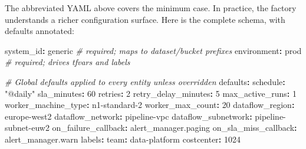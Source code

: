 \documentclass[
  11pt,
  british,
  oneside]{book}
\newenvironment{Shaded}{\begin{snugshade}}{\end{snugshade}}
\newcommand{\AttributeTok}[1]{\textcolor[rgb]{0.77,0.63,0.00}{#1}}
\newcommand{\CommentTok}[1]{\textcolor[rgb]{0.56,0.35,0.01}{\textit{#1}}}
\newcommand{\DecValTok}[1]{\textcolor[rgb]{0.00,0.00,0.81}{#1}}
\newcommand{\FunctionTok}[1]{\textcolor[rgb]{0.00,0.00,0.00}{#1}}
\newcommand{\KeywordTok}[1]{\textcolor[rgb]{0.13,0.29,0.53}{\textbf{#1}}}
\newcommand{\StringTok}[1]{\textcolor[rgb]{0.31,0.60,0.02}{#1}}
\begin{document}
The abbreviated YAML above covers the minimum case. In practice, the
factory understands a richer configuration surface. Here is the complete
schema, with defaults annotated:

\begin{Shaded}
\begin{Highlighting}[]
\FunctionTok{system\_id}\KeywordTok{:}\AttributeTok{ generic}\CommentTok{                 \# required; maps to dataset/bucket prefixes}
\FunctionTok{environment}\KeywordTok{:}\AttributeTok{ prod}\CommentTok{                  \# required; drives tfvars and labels}

\CommentTok{\# Global defaults applied to every entity unless overridden}
\FunctionTok{defaults}\KeywordTok{:}
\AttributeTok{  }\FunctionTok{schedule}\KeywordTok{:}\AttributeTok{ }\StringTok{"@daily"}
\AttributeTok{  }\FunctionTok{sla\_minutes}\KeywordTok{:}\AttributeTok{ }\DecValTok{60}
\AttributeTok{  }\FunctionTok{retries}\KeywordTok{:}\AttributeTok{ }\DecValTok{2}
\AttributeTok{  }\FunctionTok{retry\_delay\_minutes}\KeywordTok{:}\AttributeTok{ }\DecValTok{5}
\AttributeTok{  }\FunctionTok{max\_active\_runs}\KeywordTok{:}\AttributeTok{ }\DecValTok{1}
\AttributeTok{  }\FunctionTok{worker\_machine\_type}\KeywordTok{:}\AttributeTok{ n1{-}standard{-}2}
\AttributeTok{  }\FunctionTok{worker\_max\_count}\KeywordTok{:}\AttributeTok{ }\DecValTok{20}
\AttributeTok{  }\FunctionTok{dataflow\_region}\KeywordTok{:}\AttributeTok{ europe{-}west2}
\AttributeTok{  }\FunctionTok{dataflow\_network}\KeywordTok{:}\AttributeTok{ pipeline{-}vpc}
\AttributeTok{  }\FunctionTok{dataflow\_subnetwork}\KeywordTok{:}\AttributeTok{ pipeline{-}subnet{-}euw2}
\AttributeTok{  }\FunctionTok{on\_failure\_callback}\KeywordTok{:}\AttributeTok{ alert\_manager.paging}
\AttributeTok{  }\FunctionTok{on\_sla\_miss\_callback}\KeywordTok{:}\AttributeTok{ alert\_manager.warn}
\AttributeTok{  }\FunctionTok{labels}\KeywordTok{:}
\AttributeTok{    }\FunctionTok{team}\KeywordTok{:}\AttributeTok{ data{-}platform}
\AttributeTok{    }\FunctionTok{costcenter}\KeywordTok{:}\AttributeTok{ }\DecValTok{1024}


\end{Highlighting}
\end{Shaded}
\end{document}
